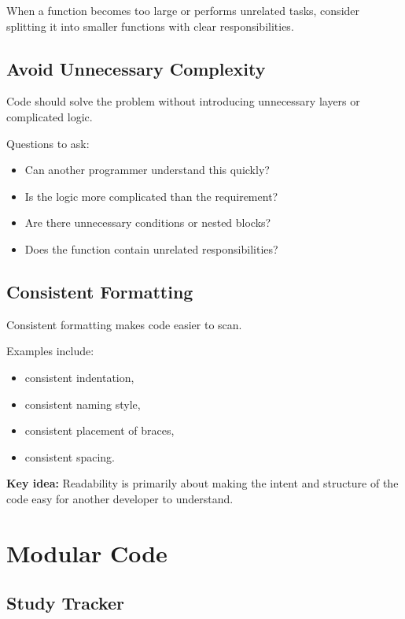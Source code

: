 \documentclass[11pt,a4paper]{article}
\begin{document}
When a function becomes too large or performs unrelated tasks, consider
splitting it into smaller functions with clear responsibilities.

\subsection{Avoid Unnecessary Complexity}

Code should solve the problem without introducing unnecessary layers or
complicated logic.

Questions to ask:

\begin{itemize}
    \item Can another programmer understand this quickly?
    \item Is the logic more complicated than the requirement?
    \item Are there unnecessary conditions or nested blocks?
    \item Does the function contain unrelated responsibilities?
\end{itemize}

\subsection{Consistent Formatting}

Consistent formatting makes code easier to scan.

Examples include:

\begin{itemize}
    \item consistent indentation,
    \item consistent naming style,
    \item consistent placement of braces,
    \item consistent spacing.
\end{itemize}

\begin{exambox}
\textbf{Key idea:} Readability is primarily about making the intent and structure
of the code easy for another developer to understand.
\end{exambox}

\section{Modular Code}

\subsection{Study Tracker}
\end{document}
